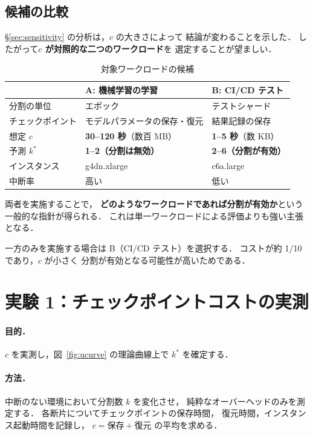 \documentclass[11pt,a4paper]{ltjsreport}
\begin{document}
\subsection{候補の比較}

\S\ref{sec:sensitivity} の分析は，$c$ の大きさによって
結論が変わることを示した．
したがって\textbf{$c$ が対照的な二つのワークロード}を
選定することが望ましい．

\begin{table}[htbp]
\centering
\caption{対象ワークロードの候補}
\label{tab:usecases}
\small
\begin{tabularx}{\textwidth}{@{}lXX@{}}
\toprule
 & \textbf{A: 機械学習の学習} & \textbf{B: CI/CD テスト} \\
\midrule
分割の単位   & エポック & テストシャード \\
チェックポイント & モデルパラメータの保存・復元 & 結果記録の保存 \\
想定 $c$     & \textbf{30--120 秒}（数百 MB） & \textbf{1--5 秒}（数 KB） \\
予測 $k^{*}$ & \textbf{1--2（分割は無効）} & \textbf{2--6（分割が有効）} \\
インスタンス & g4dn.xlarge & c6a.large \\
中断率       & 高い & 低い \\
\bottomrule
\end{tabularx}
\end{table}

両者を実施することで，
\textbf{どのようなワークロードであれば分割が有効か}という
一般的な指針が得られる．
これは単一ワークロードによる評価よりも強い主張となる．

一方のみを実施する場合は B（CI/CD テスト）を選択する．
コストが約 1/10 であり，$c$ が小さく
分割が有効となる可能性が高いためである．

\section{実験 1：チェックポイントコストの実測}

\paragraph{目的．}
$c$ を実測し，図~\ref{fig:ucurve} の理論曲線上で
$k^{*}$ を確定する．

\paragraph{方法．}
中断のない環境において分割数 $k$ を変化させ，
純粋なオーバーヘッドのみを測定する．
各断片についてチェックポイントの保存時間，
復元時間，インスタンス起動時間を記録し，
$c = \text{保存} + \text{復元}$ の平均を求める．
\end{document}
